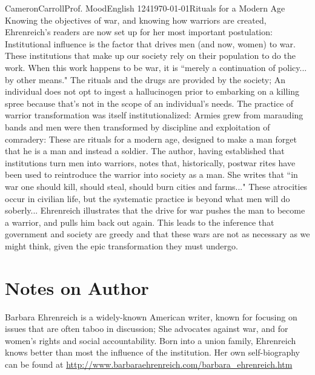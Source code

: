 \documentclass[12pt,letterpaper]{article}
\begin{document}
\begin{mla}{Cameron}{Carroll}{Prof. Mood}{English 124}{\today}{Rituals for a Modern Age}
Knowing the objectives of war, and knowing how warriors are created, Ehrenreich's readers are now set up for her most important postulation: Institutional influence is the factor that drives men (and now, women) to war. These institutions that make up our society rely on their population to do the work. When this work happens to be war, it is ``merely a continuation of policy... by other means." The rituals and the drugs are provided by the society; An individual does not opt to ingest a hallucinogen prior to embarking on a killing spree because that's not in the scope of an individual's needs. The practice of warrior transformation was itself institutionalized: Armies grew from marauding bands and men were then transformed by discipline and exploitation of comradery: These are rituals for a modern age, designed to make a man forget that he is a man and instead a soldier. The author, having established that institutions turn men into warriors, notes that, historically, postwar rites have been used to reintroduce the warrior into society as a man. She writes that ``in war one should kill, should steal, should burn cities and farms..." These atrocities occur in civilian life, but the systematic practice is beyond what men will do soberly... Ehrenreich illustrates that the drive for war pushes the man to become a warrior, and pulls him back out again. This leads to the inference that government and society are greedy and that these wars are not as necessary as we might think, given the epic transformation they must undergo.

\section*{Notes on Author}
Barbara Ehrenreich is a widely-known American writer, known for focusing on issues that are often taboo in discussion; She advocates against war, and for women's rights and social accountability. Born into a union family, Ehrenreich knows better than most the influence of the institution. Her own self-biography can be found at \url{http://www.barbaraehrenreich.com/barbara_ehrenreich.htm}


\end{mla}
\end{document}
